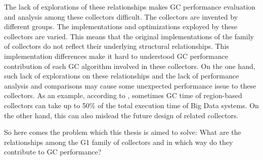 The lack of explorations of these relationships makes GC performance evaluation
and analysis among these collectors difficult.
The collectors are invented by different groups.
The implementations and optimizations exployed by these collectors are varied.
This means that the original implementations of the family of collectors do not reflect
their underlying structural relationships.
This implementation differences make it hard to understood GC performance contribution of each
GC algorithm involved in these collectors.
On the one hand, such lack of explorations on these relationships and the lack of
performance analysis and comparisons may cause some unexpected performance issue to these collectors.
As an example, according to \cite{nguyen2015speculative}, sometimes GC time of region-based collectors
can take up to 50\% of the total execution time of Big Data systems.
On the other hand, this can also mislead the future design of related collectors.

So here comes the problem which this thesis is aimed to solve: What are the relationships
among the G1 family of collectors and in which way do they contribute to GC performance?





